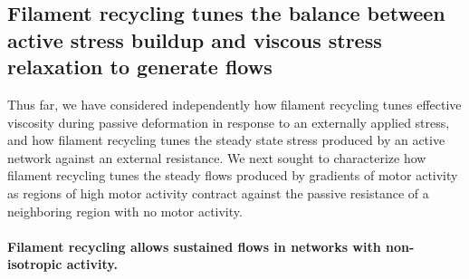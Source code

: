 \documentclass[10pt,letterpaper]{article}
\begin{document}
\subsection*{Filament recycling tunes the balance between active stress buildup and viscous stress relaxation to generate flows}

Thus far, we have considered independently how filament recycling tunes effective viscosity during passive deformation in response to an externally applied stress, and how filament recycling tunes the steady state stress produced by an active network against an external resistance. We next sought to characterize how filament recycling tunes the steady flows produced by gradients of motor activity as regions of high motor activity contract against the passive resistance of a neighboring region with no motor activity. 

\paragraph{Filament recycling allows sustained flows in networks with non-isotropic activity.}
\end{document}

